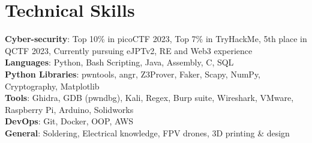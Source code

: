 \section{Technical Skills}

\begin{itemize}[leftmargin=0.15in, label={}]
    \small{\item{
        \textbf{Cyber-security}{: Top 10\% in picoCTF 2023, Top 7\% in TryHackMe, 5th place in QCTF 2023, Currently pursuing eJPTv2, RE and Web3 experience} \\ \vspace{2mm}
        \textbf{Languages}{: Python, Bash Scripting, Java, Assembly, C, SQL} \\ \vspace{2mm}
        \textbf{Python Libraries}{: pwntools, angr, Z3Prover, Faker, Scapy, NumPy, Cryptography, Matplotlib} \\ \vspace{2mm}
        \textbf{Tools}{: Ghidra, GDB (pwndbg), Kali, Regex, Burp suite, Wireshark, VMware, Raspberry Pi, Arduino, Solidworks} \\ \vspace{2mm}
        \textbf{DevOps}{: Git, Docker, OOP, AWS}\\ \vspace{2mm}
        \textbf{General}{: Soldering, Electrical knowledge, FPV drones, 3D printing \& design}\\
    }}
\end{itemize}